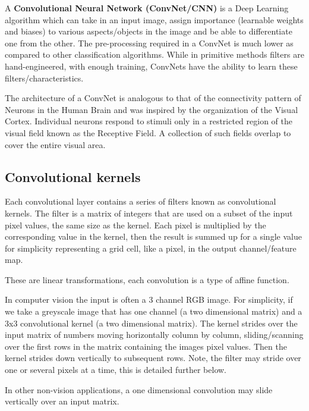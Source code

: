     A \textbf{Convolutional Neural Network (ConvNet/CNN)} is a Deep Learning algorithm which can take in an input image, assign importance (learnable weights and biases) to various aspects/objects in the image and be able to differentiate one from the other. The pre-processing required in a ConvNet is much lower as compared to other classification algorithms. While in primitive methods filters are hand-engineered, with enough training, ConvNets have the ability to learn these filters/characteristics.

    The architecture of a ConvNet is analogous to that of the connectivity pattern of Neurons in the Human Brain and was inspired by the organization of the Visual Cortex. Individual neurons respond to stimuli only in a restricted region of the visual field known as the Receptive Field. A collection of such fields overlap to cover the entire visual area.

    \subsection{Convolutional kernels}
        Each convolutional layer contains a series of filters known as convolutional kernels. The filter is a matrix of integers that are used on a subset of the input pixel values, the same size as the kernel. Each pixel is multiplied by the corresponding value in the kernel, then the result is summed up for a single value for simplicity representing a grid cell, like a pixel, in the output channel/feature map.

        These are linear transformations, each convolution is a type of affine function.

        In computer vision the input is often a 3 channel RGB image. For simplicity, if we take a greyscale image that has one channel (a two dimensional matrix) and a 3x3 convolutional kernel (a two dimensional matrix). The kernel strides over the input matrix of numbers moving horizontally column by column, sliding/scanning over the first rows in the matrix containing the images pixel values. Then the kernel strides down vertically to subsequent rows. Note, the filter may stride over one or several pixels at a time, this is detailed further below.

        In other non-vision applications, a one dimensional convolution may slide vertically over an input matrix.\\

